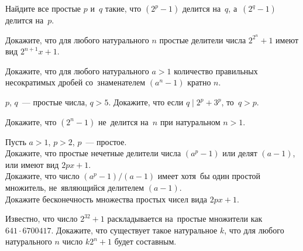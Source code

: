 \begin{problems}

\item
Найдите все простые $p$ и~$q$ такие, что $(2^p - 1)$ делится на~$q$,
а~$(2^q - 1)$ делится на~$p$.

\item
Докажите, что для любого натурального $n$ простые делители числа $2^{2^n} + 1$
имеют вид $2^{n+1} x + 1$.

\item
Докажите, что для любого натурального $a > 1$ количество правильных
несократимых дробей со~знаменателем $(a^n - 1)$ кратно $n$.

\item
$p$, $q$~--- простые числа, $q > 5$.
Докажите, что если $q \mid 2^p + 3^p$, то~$q > p$.

\item
Докажите, что $(2^n - 1)$ не~делится на~$n$ при натуральном $n > 1$.

\item
Пусть $a > 1$, $p > 2$, $p$~--- простое.
\\
\subproblem
Докажите, что простые нечетные делители числа $(a^p - 1)$ или делят $(a - 1)$,
или имеют вид $2 p x + 1$.
\\
\subproblem
Докажите, что число $(a^p - 1) / (a - 1)$ имеет хотя~бы один простой
множитель, не~являющийся делителем $(a - 1)$.
\\
\subproblem
Докажите бесконечность множества простых чисел вида $2 p x + 1$.

\item
Известно, что число $2^{32} + 1$ раскладывается на~простые множители как
$641 \cdot 6700417$.
Докажите, что существует такое натуральное $k$, что для любого
натурального $n$ число $k 2^n + 1$ будет составным.

\end{problems}

